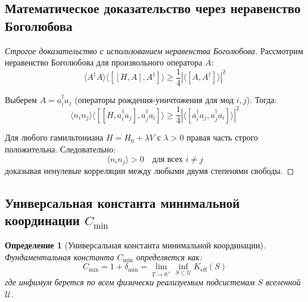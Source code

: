 \documentclass[11pt,a4paper]{article}
\newtheorem{definition}{Определение}
\begin{document}
	\subsection{Математическое доказательство через неравенство Боголюбова}
	
	\begin{proof}[Строгое доказательство с использованием неравенства Боголюбова]
		Рассмотрим неравенство Боголюбова для произвольного оператора $A$:
		\begin{equation}
			\langle A^\dagger A \rangle \langle [[H, A], A^\dagger] \rangle \geq \frac{1}{4} |\langle [A, A^\dagger] \rangle|^2
		\end{equation}
		
		Выберем $A = a_i^\dagger a_j$ (операторы рождения-уничтожения для мод $i,j$). Тогда:
		\begin{equation}
			\langle n_i n_j \rangle \langle [[H, a_i^\dagger a_j], a_j^\dagger a_i] \rangle \geq \frac{1}{4} |\langle [a_i^\dagger a_j, a_j^\dagger a_i] \rangle|^2
		\end{equation}
		
		Для любого гамильтониана $H = H_0 + \lambda V$ с $\lambda > 0$ правая часть строго положительна. Следовательно:
		\begin{equation}
			\langle n_i n_j \rangle > 0 \quad \text{для всех } i \neq j
		\end{equation}
		доказывая ненулевые корреляции между любыми двумя степенями свободы.
	\end{proof}
	
	\subsection{Универсальная константа минимальной координации $C_{\min}$}
	
	\begin{definition}[Универсальная константа минимальной координации]
		Фундаментальная константа $C_{\min}$ определяется как:
		\begin{equation}
			C_{\min} = 1 + \delta_{\min} = \lim_{T \to 0^+} \inf_{S \subset \mathcal{U}} K_{\mathrm{eff}}(S)
		\end{equation}
		где инфимум берется по всем физически реализуемым подсистемам $S$ вселенной $\mathcal{U}$.
	\end{definition}
	
\end{document}
